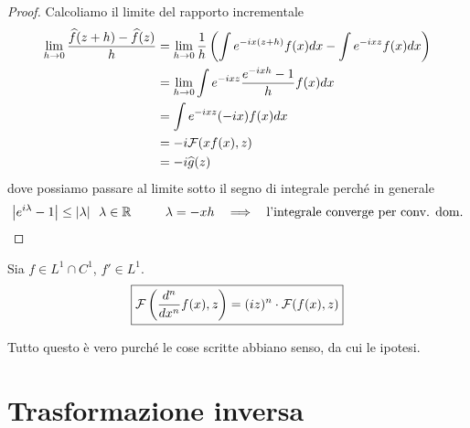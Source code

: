 \begin{proof}

Calcoliamo il limite del rapporto incrementale
\begin{equation*}
\begin{aligned}
\lim\limits_{h\rightarrow 0}\frac{\widehat{f}(z + h) - \widehat{f}(z)}{h} & = \lim\limits_{h\rightarrow 0}\frac{1}{h}\left(\int e^{- ix(z + h)} f(x) dx - \int e^{- ixz} f(x) dx\right)\\
 & = \lim\limits_{h\rightarrow 0}\int e^{- ixz}\frac{e^{- ixh} - 1}{h} f(x) dx\\
 & = \int e^{- ixz}(- ix) f(x) dx\\
 & = - i\mathcal{F}(xf(x), z)\\
 & = - i\widehat{g}(z)
\end{aligned}
\end{equation*}
dove possiamo passare al limite sotto il segno di integrale perché in generale
\begin{equation*}
\left| e^{i\lambda} - 1\right| \leq | \lambda | \ \ \lambda \in \RR \ \ \ \ \ \ \ \ \lambda = - xh\ \ \implies \ \ \text{l'integrale converge per conv. dom.}
\end{equation*}
\end{proof}
\begin{thm}
Sia $f\in L^{1} \cap C^{1}$, $f'\in L^{1}$.
\begin{equation*}
\boxed{\mathcal{F}\left(\frac{d^{n}}{dx^{n}} f(x), z\right) = (iz)^{n} \cdot \mathcal{F}(f(x), z)}
\end{equation*}
\end{thm}
Tutto questo è vero purché le cose scritte abbiano senso, da cui le ipotesi.

\section{Trasformazione inversa}

